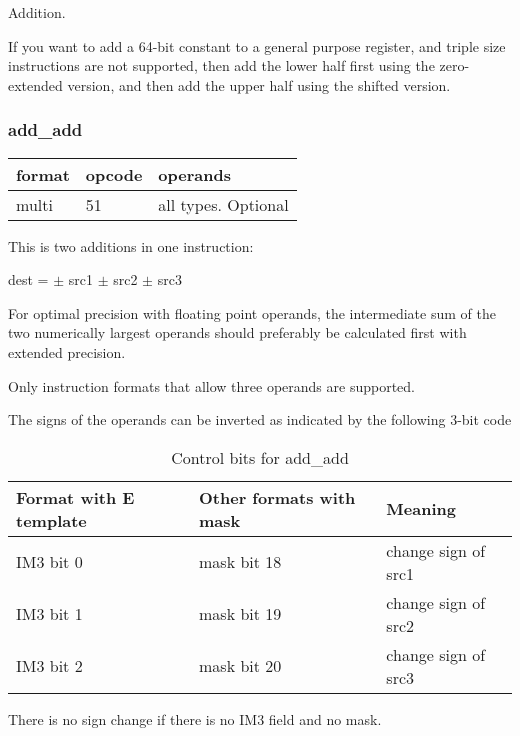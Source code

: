 \documentclass[forwardcom.tex]{subfiles}
\begin{document}
Addition.
\vspace{2mm}

If you want to add a 64-bit constant to a general purpose register, and triple size instructions are not supported, then add the lower half first using the zero-extended version, and then add the upper half using the shifted version.


\subsubsection{add\_add}
\label{table:addAddInstruction}
\begin{tabular}{|p{12mm}|p{12mm}|p{110mm}|}
\hline
\bfseries format & \bfseries opcode & \bfseries operands \\ \hline
multi & 51 & all types. Optional \\ \hline
\end{tabular}
\vspace{3mm}

This is two additions in one instruction:
\vspace{2mm}

dest = $\pm$ src1 $\pm$ src2 $\pm$ src3
\vspace{2mm}

For optimal precision with floating point operands, the intermediate sum of the two numerically largest operands should preferably be calculated first with extended precision.
\vspace{2mm}

Only instruction formats that allow three operands are supported.
\vspace{2mm}

The signs of the operands can be inverted as indicated by the following 3-bit code

\begin{longtable} {|p{20mm}|p{20mm}|p{75mm}|}
\caption{Control bits for add\_add} 
\label{table:ControlBitsForAddAdd} \\
\endfirsthead
\endhead
\hline
\bfseries Format with E template & \bfseries Other formats with mask & \bfseries Meaning   \\
\hline
IM3 bit 0 & mask bit 18 & change sign of src1 \\
IM3 bit 1 & mask bit 19 & change sign of src2 \\
IM3 bit 2 & mask bit 20 & change sign of src3 \\
\hline
\end{longtable}

There is no sign change if there is no IM3 field and no mask. 
\vspace{2mm}
\end{document}
